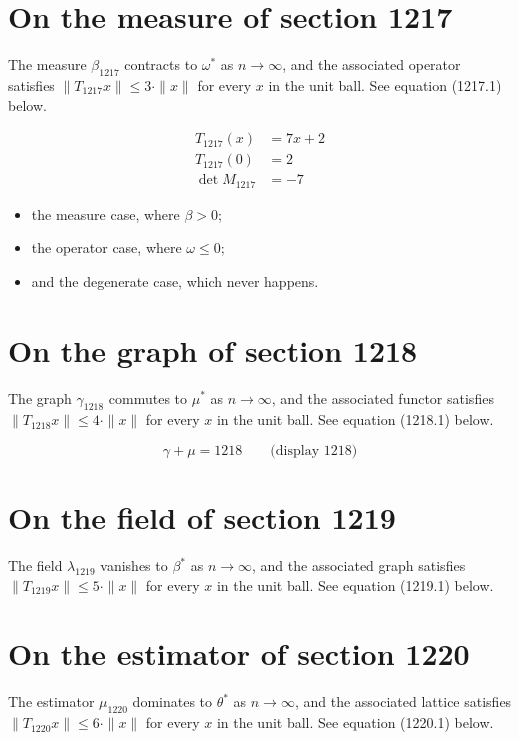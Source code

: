 \documentclass{article}
\begin{document}
\section{On the measure of section 1217}
The measure $\beta_{1217}$ contracts to $\omega^{*}$ as $n \to \infty$,
and the associated operator satisfies $\|T_{1217} x\| \leq 3 \cdot \|x\|$
for every $x$ in the unit ball. See equation (1217.1) below.

\begin{align}
T_{1217}(x) &= 7 x + 2 \\
T_{1217}(0) &= 2 \\
\det M_{1217} &= -7
\end{align}

\begin{itemize}
  \item the measure case, where $\beta > 0$;
  \item the operator case, where $\omega \leq 0$;
  \item and the degenerate case, which never happens.
\end{itemize}

\section{On the graph of section 1218}
The graph $\gamma_{1218}$ commutes to $\mu^{*}$ as $n \to \infty$,
and the associated functor satisfies $\|T_{1218} x\| \leq 4 \cdot \|x\|$
for every $x$ in the unit ball. See equation (1218.1) below.

$$
\gamma + \mu = 1218 \qquad \text{(display 1218)}
$$

\section{On the field of section 1219}
The field $\lambda_{1219}$ vanishes to $\beta^{*}$ as $n \to \infty$,
and the associated graph satisfies $\|T_{1219} x\| \leq 5 \cdot \|x\|$
for every $x$ in the unit ball. See equation (1219.1) below.

\section{On the estimator of section 1220}
The estimator $\mu_{1220}$ dominates to $\theta^{*}$ as $n \to \infty$,
and the associated lattice satisfies $\|T_{1220} x\| \leq 6 \cdot \|x\|$
for every $x$ in the unit ball. See equation (1220.1) below.
\end{document}
